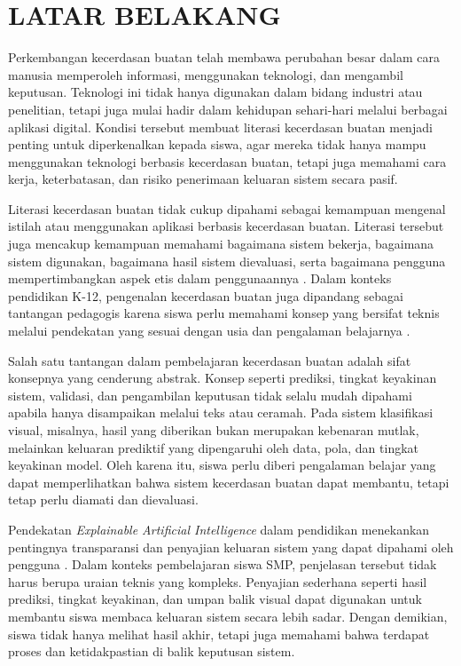 \documentclass[12pt,a4paper,oneside,openany]{report}
\begin{document}
\section{LATAR BELAKANG}
\label{sec:latar-belakang}

Perkembangan kecerdasan buatan telah membawa perubahan besar dalam cara manusia memperoleh informasi, menggunakan teknologi, dan mengambil keputusan. Teknologi ini tidak hanya digunakan dalam bidang industri atau penelitian, tetapi juga mulai hadir dalam kehidupan sehari-hari melalui berbagai aplikasi digital. Kondisi tersebut membuat literasi kecerdasan buatan menjadi penting untuk diperkenalkan kepada siswa, agar mereka tidak hanya mampu menggunakan teknologi berbasis kecerdasan buatan, tetapi juga memahami cara kerja, keterbatasan, dan risiko penerimaan keluaran sistem secara pasif.

Literasi kecerdasan buatan tidak cukup dipahami sebagai kemampuan mengenal istilah atau menggunakan aplikasi berbasis kecerdasan buatan. Literasi tersebut juga mencakup kemampuan memahami bagaimana sistem bekerja, bagaimana sistem digunakan, bagaimana hasil sistem dievaluasi, serta bagaimana pengguna mempertimbangkan aspek etis dalam penggunaannya \cite{ref1}. Dalam konteks pendidikan K-12, pengenalan kecerdasan buatan juga dipandang sebagai tantangan pedagogis karena siswa perlu memahami konsep yang bersifat teknis melalui pendekatan yang sesuai dengan usia dan pengalaman belajarnya \cite{ref2}.

Salah satu tantangan dalam pembelajaran kecerdasan buatan adalah sifat konsepnya yang cenderung abstrak. Konsep seperti prediksi, tingkat keyakinan sistem, validasi, dan pengambilan keputusan tidak selalu mudah dipahami apabila hanya disampaikan melalui teks atau ceramah. Pada sistem klasifikasi visual, misalnya, hasil yang diberikan bukan merupakan kebenaran mutlak, melainkan keluaran prediktif yang dipengaruhi oleh data, pola, dan tingkat keyakinan model. Oleh karena itu, siswa perlu diberi pengalaman belajar yang dapat memperlihatkan bahwa sistem kecerdasan buatan dapat membantu, tetapi tetap perlu diamati dan dievaluasi.

Pendekatan \textit{Explainable Artificial Intelligence} dalam pendidikan menekankan pentingnya transparansi dan penyajian keluaran sistem yang dapat dipahami oleh pengguna \cite{ref3}. Dalam konteks pembelajaran siswa SMP, penjelasan tersebut tidak harus berupa uraian teknis yang kompleks. Penyajian sederhana seperti hasil prediksi, tingkat keyakinan, dan umpan balik visual dapat digunakan untuk membantu siswa membaca keluaran sistem secara lebih sadar. Dengan demikian, siswa tidak hanya melihat hasil akhir, tetapi juga memahami bahwa terdapat proses dan ketidakpastian di balik keputusan sistem.
\end{document}
